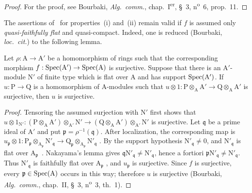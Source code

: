\begin{proof}
For the proof, see Bourbaki, \emph{Alg.\ comm.}, chap.~I\textsuperscript{er}, \S~3, n\textsuperscript{o}~6, prop.~11.
\end{proof}

\begin{remark}[2.5.4]
\label{IV.2.5.4}
The assertions of~ for properties~(i) and~(ii) remain
valid if $f$ is assumed only \emph{quasi-faithfully flat}
 and quasi-compact. Indeed, one is reduced (Bourbaki,
\emph{loc.\ cit.}) to the following lemma.
\end{remark}

\begin{lemma}[2.5.4.1]
\label{IV.2.5.4.1}
Let $\rho:\mathrm{A}\to\mathrm{A}'$ be a homomorphism of rings such that
the corresponding morphism
$f:\operatorname{Spec}(\mathrm{A}')\to\operatorname{Spec}(\mathrm{A})$ is surjective. Suppose that
there is an $\mathrm{A}'$-module $\mathrm{N}'$ of finite type which is
flat over $\mathrm{A}$ and has support $\operatorname{Spec}(\mathrm{A}')$. If
$u:\mathrm{P}\to\mathrm{Q}$ is a homomorphism of $\mathrm{A}$-modules
such that $u\otimes 1:
\mathrm{P}\otimes_{\mathrm{A}}\mathrm{A}'
\longrightarrow
\mathrm{Q}\otimes_{\mathrm{A}}\mathrm{A}'$
is surjective, then $u$ is surjective.
\end{lemma}

\begin{proof}
Tensoring the assumed surjection with $\mathrm{N}'$ first shows that $u\otimes 1_{\mathrm{N}'}:
(\mathrm{P}\otimes_{\mathrm{A}}\mathrm{A}')
\otimes_{\mathrm{A}'}\mathrm{N}'
\longrightarrow
(\mathrm{Q}\otimes_{\mathrm{A}}\mathrm{A}')
\otimes_{\mathrm{A}'}\mathrm{N}'$
is surjective. Let $\mathfrak{q}$ be a prime ideal of $\mathrm{A}'$ and
put $\mathfrak{p}=\rho^{-1}(\mathfrak{q})$. After localization, the
corresponding map is $u_{\mathfrak{p}}\otimes 1:
\mathrm{P}_{\mathfrak{p}}
\otimes_{\mathrm{A}_{\mathfrak{p}}}\mathrm{N}'_{\mathfrak{q}}
\longrightarrow
\mathrm{Q}_{\mathfrak{p}}
\otimes_{\mathrm{A}_{\mathfrak{p}}}\mathrm{N}'_{\mathfrak{q}}$
. By the support hypothesis
$\mathrm{N}'_{\mathfrak{q}}\neq0$, and
$\mathrm{N}'_{\mathfrak{q}}$ is flat over
$\mathrm{A}_{\mathfrak{p}}$~. Nakayama's lemma gives
$\mathfrak{q}\mathrm{N}'_{\mathfrak{q}}\neq
\mathrm{N}'_{\mathfrak{q}}$, hence a fortiori
$\mathfrak{p}\mathrm{N}'_{\mathfrak{q}}\neq
\mathrm{N}'_{\mathfrak{q}}$. Thus $\mathrm{N}'_{\mathfrak{q}}$ is
faithfully flat over $\mathrm{A}_{\mathfrak{p}}$
, and $u_{\mathfrak{p}}$ is surjective. Since $f$ is
surjective, every $\mathfrak{p}\in\operatorname{Spec}(\mathrm{A})$ occurs in this way;
therefore $u$ is surjective (Bourbaki, \emph{Alg.\ comm.}, chap.~II,
\S~3, n\textsuperscript{o}~3, th.~1).
\end{proof}

